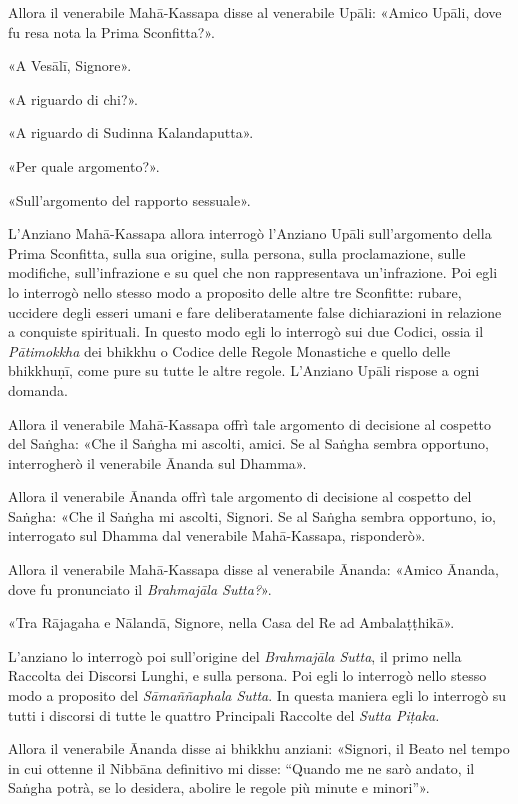 Allora il venerabile Mahā-Kassapa disse al venerabile Upāli: «Amico Upāli, dove
fu resa nota la Prima Sconfitta?».

«A Vesālī, Signore».

«A riguardo di chi?».

«A riguardo di Sudinna Kalandaputta».

«Per quale argomento?».

«Sull’argomento del rapporto sessuale».

 L’Anziano Mahā-Kassapa allora interrogò l’Anziano
Upāli sull’argomento della Prima Sconfitta, sulla sua origine, sulla persona,
sulla proclamazione, sulle modifiche, sull’infrazione e su quel che non
rappresentava un’infrazione. Poi egli lo interrogò nello stesso modo a proposito
delle altre tre Sconfitte: rubare, uccidere degli esseri umani e fare
deliberatamente false dichiarazioni in relazione a conquiste spirituali. In
questo modo egli lo interrogò sui due Codici, ossia il \emph{Pātimokkha} dei
bhikkhu o Codice delle Regole Monastiche e quello delle bhikkhuṇī, come pure su
tutte le altre regole. L’Anziano Upāli rispose a ogni domanda.

 Allora il venerabile Mahā-Kassapa offrì tale argomento di
decisione al cospetto del Saṅgha: «Che il Saṅgha mi ascolti, amici. Se al Saṅgha
sembra opportuno, interrogherò il venerabile Ānanda sul Dhamma».

Allora il venerabile Ānanda offrì tale argomento di decisione al cospetto del
Saṅgha: «Che il Saṅgha mi ascolti, Signori. Se al Saṅgha sembra opportuno, io,
interrogato sul Dhamma dal venerabile Mahā-Kassapa, risponderò».

Allora il venerabile Mahā-Kassapa disse al venerabile Ānanda: «Amico Ānanda,
dove fu pronunciato il \emph{Brahmajāla Sutta?}».

«Tra Rājagaha e Nālandā, Signore, nella Casa del Re ad Ambalaṭṭhikā».

 L’anziano lo interrogò poi sull’origine del
\emph{Brahmajāla Sutta}, il primo nella Raccolta dei Discorsi Lunghi, e sulla
persona. Poi egli lo interrogò nello stesso modo a proposito del
\emph{Sāmaññaphala Sutta}. In questa maniera egli lo interrogò su tutti i
discorsi di tutte le quattro Principali Raccolte del \emph{Sutta Piṭaka.}

 Allora il venerabile Ānanda disse ai bhikkhu anziani:
«Signori, il Beato nel tempo in cui ottenne il Nibbāna definitivo mi disse:
“Quando me ne sarò andato, il Saṅgha potrà, se lo desidera, abolire le regole
più minute e minori”».

